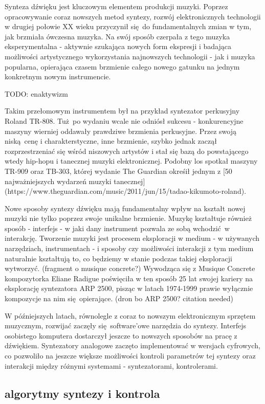 \documentclass[magisterska]{pracamgr}
\begin{document}
Synteza dźwięku jest kluczowym elementem produkcji muzyki. Poprzez opracowywanie coraz nowszych metod syntezy, rozwój elektronicznych technologii w drugiej połowie XX wieku przyczynił się do fundamentalnych zmian w tym, jak brzmiała ówczesna muzyka. Na swój sposób czerpała z tego muzyka eksperymentalna - aktywnie szukająca nowych form ekspresji i badająca możliwości artystycznego wykorzystania najnowszych technologii - jak i muzyka popularna, opierająca czasem brzmienie całego nowego gatunku na jednym konkretnym nowym instrumencie.

TODO: enaktywizm

Takim przełomowym instrumentem był na przykład syntezator perkusyjny Roland TR-808. Tuż po wydaniu wcale nie odniósł sukcesu - konkurencyjne maszyny wierniej oddawały prawdziwe brzmienia perkusyjne. Przez swoją niską cenę i charakterstyczne, inne brzmienie, szybko jednak zaczął rozprzestrzeniać się wśród niszowych artystów i stał się bazą do powstającego wtedy hip-hopu i tanecznej muzyki elektronicznej. Podobny los spotkał maszyny TR-909 oraz TB-303, której wydanie The Guardian okreśił jednym z [50 najważniejszych wydarzeń muzyki tanecznej](https://www.theguardian.com/music/2011/jun/15/tadao-kikumoto-roland).

Nowe sposoby syntezy dźwięku mają fundamentalny wpływ na kształt nowej muzyki nie tylko poprzez swoje unikalne brzmienie. Muzykę kształtuje również sposób - interfejs - w jaki dany instrument pozwala ze sobą wchodzić w interakcję. Tworzenie muzyki jest procesem eksploracji w medium - w używanych narzędziach, instrumentach - i sposoby czy możliwości interakcji z tym medium naturalnie kształtują to, co będziemy w stanie podczas takiej eksploracji wytworzyć. (fragment o musique concrete?) Wywodząca się z Musique Concrete kompozytorka Eliane Radigue poświęciła w ten sposób 25 lat swojej kariery na eksplorację syntezatora ARP 2500, pisząc w latach 1974-1999 prawie wyłącznie kompozycje na nim się opierające. (dron bo ARP 2500? citation needed)

W późniejszych latach, równolegle z coraz to nowszym elektronicznym sprzętem muzycznym, rozwijać zaczęły się software'owe narzędzia do syntezy. Interfejs osobistego komputera dostarczył jeszcze to nowszych sposobów na pracę z dźwiękiem. Syntezatory analogowe zaczęto implementować w wersjach cyfrowych, co pozwoliło na jeszcze większe możliwości kontroli parametrów tej syntezy oraz interakcji między różnymi systemami - syntezatorami, kontrolerami.

\subsection{algorytmy syntezy i kontrola}
\end{document}
